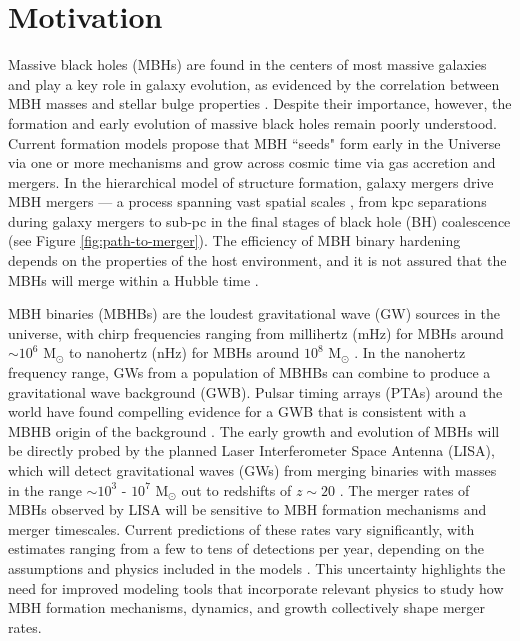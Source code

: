 \documentclass[11pt, letterpaper]{article}
\newcommand{\msun}{M$_{\odot}$}
\begin{document}
\section{Motivation}

Massive black holes (MBHs) are found in the centers of most massive galaxies \cite{Kormendy_1995,magorrian_demography_1998} and play a key role in galaxy evolution, as evidenced by the correlation between MBH masses and stellar bulge properties \cite{ferrarese_fundamental_2000,gultekin_m-sigma_2009,Kormendy_2013,mcconnell_revisiting_2013}. Despite their importance, however, the formation and early evolution of massive black holes remain poorly understood. Current formation models propose that MBH ``seeds" form early in the Universe via one or more mechanisms \cite{Madau_2001,Davies2011,Bromm_Loeb_2003} and grow across cosmic time via gas accretion and mergers. In the hierarchical model of structure formation, galaxy mergers drive MBH mergers — a process spanning vast spatial scales \cite{Begelman1980,merritt_massive_2005}, from kpc separations during galaxy mergers to sub-pc in the final stages of black hole (BH) coalescence (see Figure \ref{fig:path-to-merger}). The efficiency of MBH binary hardening depends on the properties of the host environment, and it is not assured that the MBHs will merge within a Hubble time \cite{2003MerritandMilosavljevic}. 

MBH binaries (MBHBs) are the loudest gravitational wave (GW) sources in the universe, with chirp frequencies ranging from millihertz (mHz) for MBHs around $\sim 10^6$ \msun{} to nanohertz (nHz) for MBHs around $10^8$ \msun{} \citep{Sesana2013}. In the nanohertz frequency range, GWs from a population of MBHBs can combine to produce a gravitational wave background (GWB). Pulsar timing arrays (PTAs) around the world have found compelling evidence for a GWB that is consistent with a MBHB origin of the background \citep{agazie_nanograv_2023,antoniadis_second_2023,reardon_search_2023,xu_searching_2023}. The early growth and evolution of MBHs will be directly probed by the planned Laser Interferometer Space Antenna (LISA), which will detect gravitational waves (GWs) from merging binaries with masses in the range $\sim 10^3$ - $10^7$ \msun{} out to redshifts of $z \sim 20$ \cite{Amaro2017lisa}. The merger rates of MBHs observed by LISA will be sensitive to MBH formation mechanisms and merger timescales. Current predictions of these rates vary significantly, with estimates ranging from a few to tens of detections per year, depending on the assumptions and physics included in the models \cite{Klein_2016,Kelley_2017a,Kelley_2018,Dayal_2019,Katz2020}. This uncertainty highlights the need for improved modeling tools that incorporate relevant physics to study how MBH formation mechanisms, dynamics, and growth collectively shape merger rates. 
\end{document}
